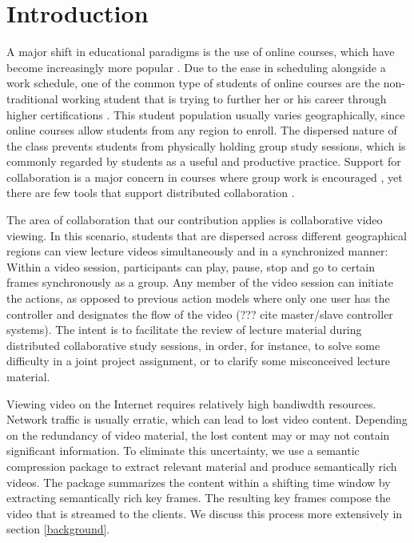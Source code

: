 \documentclass{sig-alternate}
\begin{document}
\section{Introduction}
A major shift in educational paradigms is the use of online courses,
which have become increasingly more popular \cite{BELLER,DOE}.  Due to
the ease in scheduling alongside a work schedule, one of the common
type of students of online courses are the non-traditional working
student that is trying to further her or his career through higher
certifications \cite{BURGESS}.  This student population usually
varies geographically, since online courses allow students from any
region to enroll.  The dispersed nature of the class prevents students
from physically holding group study sessions, which is commonly
regarded by students as a useful and productive practice.  Support for
collaboration is a major concern in courses where group work is
encouraged \cite{WELLS}, yet there are few tools that support
distributed collaboration \cite{BURGESS}.

The area of collaboration that our contribution applies is
collaborative video viewing.  In this scenario, students that are
dispersed across different geographical regions can view lecture
videos simultaneously and in a synchronized manner: Within a video
session, participants can play, pause, stop and go to certain frames
synchronously as a group.  Any member of the video session can
initiate the actions, as opposed to previous action models where only
one user has the controller and designates the flow of the video (???
cite master/slave controller systems).  The intent is to facilitate
the review of lecture material during distributed collaborative study
sessions, in order, for instance, to solve some difficulty in a joint
project assignment, or to clarify some misconceived lecture material.

Viewing video on the Internet requires relatively high bandiwdth
resources.  Network traffic is usually erratic, which can lead to lost
video content. Depending on the redundancy of video material, the lost
content may or may not contain significant information.  To eliminate
this uncertainty, we use a semantic compression package
\cite{TIECHENG} to extract relevant material and produce semantically
rich videos.  The package summarizes the content within a shifting
time window by extracting semantically rich key frames.  The resulting
key frames compose the video that is streamed to the clients.  We
discuss this process more extensively in section \ref{background}.
\end{document}
